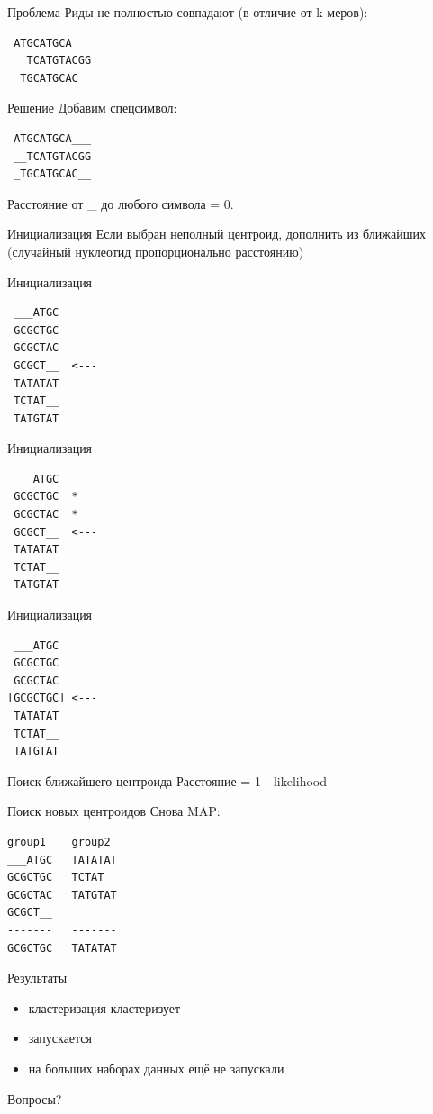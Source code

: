 \documentclass[10pt]{beamer}
\begin{document}
\begin{frame}[fragile]{Проблема}
  Риды не полностью совпадают (в отличие от k-меров):
\begin{verbatim}
 ATGCATGCA
   TCATGTACGG
  TGCATGCAC
\end{verbatim}
\end{frame}

\begin{frame}[fragile]{Решение}
  Добавим спецсимвол:
\begin{verbatim}
 ATGCATGCA___
 __TCATGTACGG
 _TGCATGCAC__
\end{verbatim}
  Расстояние от \_ до любого символа = 0.
\end{frame}

\begin{frame}{Инициализация}
  Если выбран неполный центроид, дополнить из ближайших (случайный нуклеотид пропорционально расстоянию)
\end{frame}

\begin{frame}[fragile]{Инициализация}
\begin{verbatim}
 ___ATGC
 GCGCTGC
 GCGCTAC
 GCGCT__  <---
 TATATAT
 TCTAT__
 TATGTAT
\end{verbatim}
\end{frame}

\begin{frame}[fragile]{Инициализация}
\begin{verbatim}
 ___ATGC
 GCGCTGC  *
 GCGCTAC  *
 GCGCT__  <---
 TATATAT
 TCTAT__
 TATGTAT
\end{verbatim}
\end{frame}

\begin{frame}[fragile]{Инициализация}
\begin{verbatim}
 ___ATGC
 GCGCTGC
 GCGCTAC
[GCGCTGC] <---
 TATATAT
 TCTAT__
 TATGTAT
\end{verbatim}
\end{frame}

\begin{frame}{Поиск ближайшего центроида}
  Расстояние = 1 - likelihood
\end{frame}

\begin{frame}[fragile]{Поиск новых центроидов}
  Снова MAP:
\begin{verbatim}
group1    group2
___ATGC   TATATAT
GCGCTGC   TCTAT__
GCGCTAC   TATGTAT
GCGCT__
-------   -------
GCGCTGC   TATATAT
\end{verbatim}
\end{frame}

\begin{frame}{Результаты}
  \begin{itemize}
  \item кластеризация кластеризует
  \item запускается
  \item на больших наборах данных ещё не запускали
  \end{itemize}
\end{frame}

\begin{frame}\label{lastframe}
  \begin{center}
    \Large
    Вопросы?
  \end{center}
\end{frame}
\end{document}
